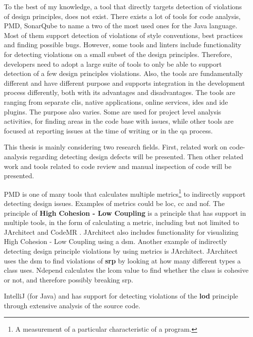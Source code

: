 \documentclass{report}
\begin{document}
To the best of my knowledge, a tool that directly targets detection of violations of design principles, does not exist. There exists a lot of tools for code analysis, PMD\cite{pmd}, SonarQube\cite{sonarqube} to name a two of the most used ones for the Java language. Most of them support detection of violations of style conventions, best practices and finding possible bugs. However, some tools and linters include functionality for detecting violations on a small subset of the design principles. Therefore, developers need to adopt a large suite of tools to only be able to support detection of a few design principles violations. Also, the tools are fundamentally different and have different purpose and supports integration in the development process differently, both with its advantages and disadvantages. The tools are ranging from separate \gls{cli}s, native applications, online services, \gls{ide}s and \gls{ide} plugins. The purpose also varies. Some are used for project level analysis activities, for finding areas in the code base with issues, while other tools are focused at reporting issues at the time of writing or in the \gls{qa} process. 

This thesis is mainly considering two research fields. First, related work on code-analysis regarding detecting design defects will be presented. Then other related work and tools related to code review and manual inspection of code will be presented.

PMD \cite{pmd} is one of many tools that calculates multiple metrics\footnote{A measurement of a particular characteristic of a program.} to indirectly support detecting design issues. Examples of metrics could be \gls{loc}, \gls{cc} and \gls{nof}. The principle of \textbf{High Cohesion - Low Coupling} is a principle that has support in multiple tools, in the form of calculating a metric, including but not limited to JArchitect \cite{jarchitect} and CodeMR \cite{codemr}. JArchitect \cite{jarchitect} also includes functionality for visualizing  High Cohesion - Low Coupling using a \gls{dsm}. Another example of indirectly detecting design principle violations by using metrics is JArchitect. JArchitect uses the \gls{dsm} to find violations of \textbf{\gls{srp}} by looking at how many different types a class uses. Ndepend \cite{ndepend} calculates the \gls{lcom} value to find whether the class is cohesive or not, and therefore possibly breaking \gls{srp}. 

IntelliJ \cite{IntelliJ} (for Java) and \cite{pmd} has support for detecting violations of the \textbf{\gls{lod}} principle through extensive analysis of the source code.
\end{document}
